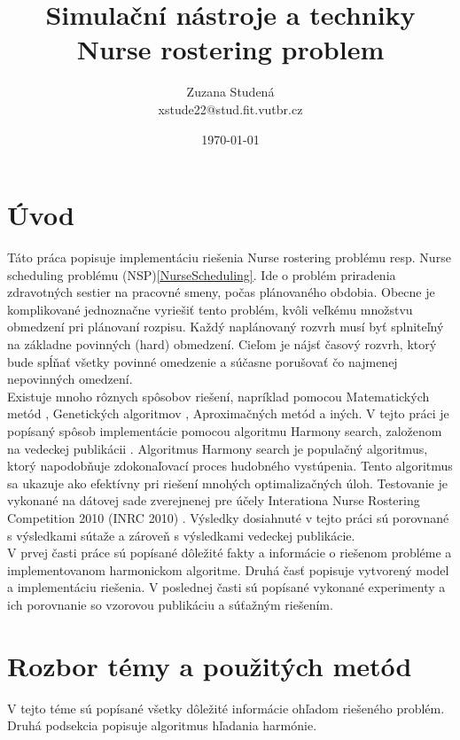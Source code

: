 \documentclass[a4paper, 14pt]{article}
\begin{document}
\title{Simulační nástroje a techniky\\
Nurse rostering problem}
\author{Zuzana Studená\\ 
xstude22@stud.fit.vutbr.cz}
\date{\today}

\maketitle

\section{Úvod}

Táto práca popisuje implementáciu riešenia Nurse rostering problému resp. Nurse scheduling problému (NSP)\ref{NurseScheduling}. Ide o problém priradenia zdravotných sestier na pracovné smeny, počas plánovaného obdobia. Obecne je komplikované jednoznačne vyriešiť tento problém, kvôli veľkému množstvu obmedzení pri plánovaní rozpisu. Každý naplánovaný rozvrh musí byť splniteľný na základne povinných (hard) obmedzení. Cieľom je nájsť časový rozvrh, ktorý bude spĺňať všetky povinné omedzenie a súčasne porušovať čo najmenej nepovinných omedzení.\\

Existuje mnoho rôznych spôsobov riešení, napríklad pomocou Matematických metód \cite{Math}, Genetických algoritmov \cite{Gen}, Aproximačných metód\cite{Apr} a iných. V tejto práci je popísaný spôsob implementácie pomocou algoritmu Harmony search, založenom na vedeckej publikácii \cite{MainArticle}. Algoritmus Harmony search\cite{HS} je populačný algoritmus, ktorý napodobňuje zdokonaľovací proces hudobného vystúpenia. Tento algoritmus sa ukazuje ako efektívny pri riešení mnohých optimalizačných úloh. Testovanie je vykonané na dátovej sade zverejnenej pre účely Interationa Nurse Rostering Competition 2010 (INRC 2010) \cite{MainArticle}. Výsledky dosiahnuté v tejto práci sú porovnané s výsledkami sútaže a zároveň s výsledkami vedeckej publikácie. \\

V prvej časti práce sú popísané dôležité fakty a informácie o riešenom probléme a implementovanom harmonickom algoritme. Druhá časť popisuje vytvorený model a implementáciu riešenia. V poslednej časti sú popísané vykonané experimenty a ich porovnanie so vzorovou publikáciu a súťažným riešením. \\


\section{Rozbor témy a použitých metód}
V tejto téme sú popísané všetky dôležité informácie ohľadom riešeného problém. Druhá podsekcia popisuje algoritmus hľadania harmónie. 
\end{document}
